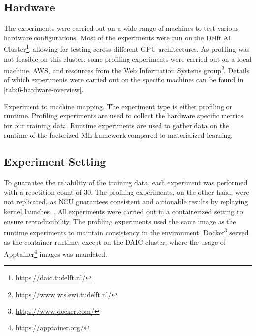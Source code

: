\subsection{Hardware}
\label{subsec:6-hardware}
The experiments were carried out on a wide range of machines to test various hardware configurations. Most of the experiments were run on the Delft AI Cluster\footnote{\url{https://daic.tudelft.nl/}}, allowing for testing across different GPU architectures. As profiling was not feasible on this cluster, some profiling experiments were carried out on a local machine, AWS, and resources from the Web Information Systems group\footnote{\url{https://www.wis.ewi.tudelft.nl/}}. Details of which experiments were carried out on the specific machines can be found in \autoref{tab:6-hardware-overview}.

\begin{table}[ht]
  \centering
  
  \caption[Experiment to machine mapping]{Experiment to machine mapping. The experiment type is either profiling or runtime. Profiling experiments are used to collect the hardware specific metrics for our training data. Runtime experiments are used to gather data on the runtime of the factorized ML framework compared to materialized learning.}
  \label{tab:6-hardware-overview}
\end{table}

\subsection{Experiment Setting}
To guarantee the reliability of the training data, each experiment was performed with a repetition count of $30$. The profiling experiments, on the other hand, were not replicated, as NCU guarantees consistent and actionable results by replaying kernel launches~\cite{nsight_compute}. All experiments were carried out in a containerized setting to ensure reproducibility. The profiling experiments used the same image as the runtime experiments to maintain consistency in the environment. Docker\footnote{\url{https://www.docker.com/}} served as the container runtime, except on the DAIC cluster, where the usage of Apptainer\footnote{\url{https://apptainer.org/}} images was mandated.

